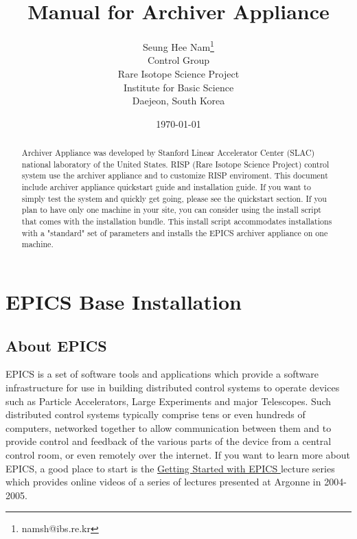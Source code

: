 \documentclass[11pt
  , a4paper
  , article
  , oneside
]{memoir}
\begin{document}
\newcommand{\technumber}{
  RAON Control-Document Series\\
  Revision : v0.4,   Release : 2016. 01. 06}
\title{\textbf{Manual for Archiver Appliance}}


\author{Seung Hee Nam\thanks{namsh@ibs.re.kr} \\
  Control Group \\
  Rare Isotope Science Project\\
  Institute for Basic Science\\
  Daejeon, South Korea
}

\date{\today}

\renewcommand{\maketitlehooka}{\begin{flushright}\textsf{\technumber}\end{flushright}}

\maketitle

\begin{abstract}
 Archiver Appliance was developed by Stanford Linear Accelerator Center (SLAC) national laboratory of the United States. RISP (Rare Isotope Science Project) control system use the archiver appliance and to customize RISP enviroment. This document include archiver appliance quickstart guide and installation guide. If you want to simply test the system and quickly get going, please see the quickstart section. If you plan to have only one machine in your site, you can consider using the install script that comes with the installation bundle. This install script accommodates installations with a "standard" set of parameters and installs the EPICS archiver appliance on one machine.
\end{abstract}



\chapter{EPICS Base Installation}

\section{About EPICS}
EPICS\cite{epics} is a set of software tools and applications which provide a software infrastructure for use in building distributed control systems to operate devices such as Particle Accelerators, Large Experiments and major Telescopes. Such distributed control systems typically comprise tens or even hundreds of computers, networked together to allow communication between them and to provide control and feedback of the various parts of the device from a central control room, or even remotely over the internet.
If you want to learn more about EPICS, a good place to start is the \href{http://www.aps.anl.gov/epics/docs/GSWE.php}{Getting Started with EPICS }lecture series which provides online videos of a series of lectures presented at Argonne in 2004-2005.
\end{document}
